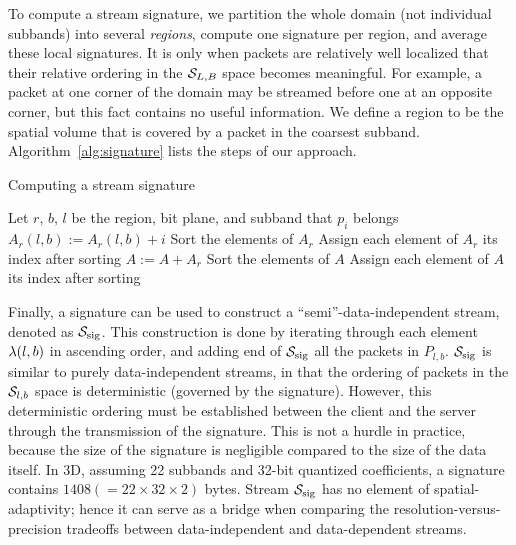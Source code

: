 To compute a stream signature, we partition the whole domain (not individual
subbands) into several \emph{regions}, compute one signature per region, and
average these local signatures. It is only when packets are relatively well
localized that their relative ordering in the $\strm_{L,B}$ space becomes
meaningful. For example, a packet at one corner of the domain may be streamed
before one at an opposite corner, but this fact contains no useful information.
We define a region to be the spatial volume that is covered by a packet in the
coarsest subband. Algorithm~\ref{alg:signature} lists the steps of our
approach.

\begin{algorithm}[h]
  \small
  \caption{Computing a stream signature}
  \begin{algorithmic}[1]
			\State Let $r$, $b$, $l$ be the region, bit plane, and subband that $p_i$ belongs
			\State $A_r(l,b) := A_r(l,b)+i$
		\EndFor
			\State Sort the elements of $A_r$
			\State Assign each element of $A_r$ its index after sorting
			\State $A := A+A_r$
		\EndFor
		\State Sort the elements of $A$
		\State Assign each element of $A$ its index after sorting
	\end{algorithmic}
	\label{alg:signature}
\end{algorithm}

Finally, a signature can be used to construct a ``semi''-data-independent
stream, denoted as $\ssig$. This construction is done by iterating through
each element $\sgn(l,b)$ in ascending order, and adding end of $\ssig$ all the
packets in $P_{l,b}$. $\ssig$ is similar to purely data-independent streams,
in that the ordering of packets in the $\strm_{l,b}$ space is deterministic
(governed by the signature). However, this deterministic ordering must be
established between the client and the server through the transmission of the
signature. This is not a hurdle in practice, because the size of the signature
is negligible compared to the size of the data itself. In 3D, assuming
22 subbands and 32-bit quantized coefficients, a signature contains $1408
(=22\times 32\times 2)$ bytes. Stream $\ssig$ has no element of spatial-adaptivity;
hence it can serve as a bridge when comparing the resolution-versus-precision
tradeoffs between data-independent and data-dependent streams.
